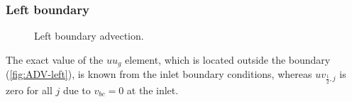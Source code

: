 \documentclass{article}
\numberwithin{equation}{section}
\begin{document}
\subsubsection{Left boundary}\label{subsubsec:advection-left-bottom}
\begin{figure}[H] %
  \caption{Left boundary advection.}
\end{figure}
The exact value of the $uu_g$ element, which is located outside the boundary (\cref{fig:ADV-left}), is known from the inlet boundary conditions, whereas $uv_{\frac{1}{2},j}$ is zero for all $j$ due to $v_{bc}=0$ at the inlet. 
\end{document}

